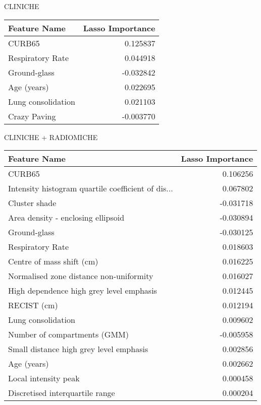 CLINICHE

\begin{tabular}{lr}
\toprule
{Feature Name} &  Lasso Importance \\
\midrule
CURB65             &          0.125837 \\
Respiratory Rate   &          0.044918 \\
Ground-glass       &         -0.032842 \\
Age (years)        &          0.022695 \\
Lung consolidation &          0.021103 \\
Crazy Paving       &         -0.003770 \\
\bottomrule
\end{tabular}

CLINICHE + RADIOMICHE 

\begin{tabular}{lr}
\toprule
{Feature Name} &  Lasso Importance \\
\midrule
CURB65                                             &          0.106256 \\
Intensity histogram quartile coefficient of dis... &          0.067802 \\
Cluster shade                                      &         -0.031718 \\
Area density - enclosing ellipsoid                 &         -0.030894 \\
Ground-glass                                       &         -0.030125 \\
Respiratory Rate                                   &          0.018603 \\
Centre of mass shift (cm)                          &          0.016225 \\
Normalised zone distance non-uniformity            &          0.016027 \\
High dependence high grey level emphasis           &          0.012445 \\
RECIST (cm)                                        &          0.012194 \\
Lung consolidation                                 &          0.009602 \\
Number of compartments (GMM)                       &         -0.005958 \\
Small distance high grey level emphasis            &          0.002856 \\
Age (years)                                        &          0.002662 \\
Local intensity peak                               &          0.000458 \\
Discretised interquartile range                    &          0.000204 \\
\bottomrule
\end{tabular}

